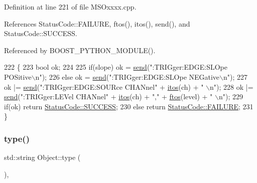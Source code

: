 Definition at line 221 of file M\+S\+Oxxxx.\+cpp.



References Status\+Code\+::\+F\+A\+I\+L\+U\+RE, ftos(), itos(), send(), and Status\+Code\+::\+S\+U\+C\+C\+E\+SS.



Referenced by B\+O\+O\+S\+T\+\_\+\+P\+Y\+T\+H\+O\+N\+\_\+\+M\+O\+D\+U\+L\+E().


\begin{DoxyCode}
222 \{
223     \textcolor{keywordtype}{bool} ok;
224 
225     \textcolor{keywordflow}{if}(slope) ok  = \hyperlink{classMSOxxxx_ae77668a1ae4ccb74e0ed5f2485dfdebf}{send}(\textcolor{stringliteral}{":TRIGger:EDGE:SLOpe POSitive\(\backslash\)n"});
226     \textcolor{keywordflow}{else}            ok  = \hyperlink{classMSOxxxx_ae77668a1ae4ccb74e0ed5f2485dfdebf}{send}(\textcolor{stringliteral}{":TRIGger:EDGE:SLOpe NEGative\(\backslash\)n"});
227                         ok |= \hyperlink{classMSOxxxx_ae77668a1ae4ccb74e0ed5f2485dfdebf}{send}(\textcolor{stringliteral}{":TRIGger:EDGE:SOURce CHANnel"} + \hyperlink{Tools_8h_af330027dbdafb9a30768b3613c553e60}{itos}(ch) + \textcolor{stringliteral}{" \(\backslash\)n"});
228                         ok |= \hyperlink{classMSOxxxx_ae77668a1ae4ccb74e0ed5f2485dfdebf}{send}(\textcolor{stringliteral}{":TRIGger:LEVel CHANnel"} + \hyperlink{Tools_8h_af330027dbdafb9a30768b3613c553e60}{itos}(ch) + \textcolor{stringliteral}{","} + 
      \hyperlink{classMSOxxxx_ab9c897c3dc0a52cbe5a5da67fc520ed7}{ftos}(level) + \textcolor{stringliteral}{" \(\backslash\)n"});
229     \textcolor{keywordflow}{if}(ok)  \textcolor{keywordflow}{return} \hyperlink{classStatusCode_a6f565cbeadc76d14c72f047e5e85eb4badd0da38d3ba0d922efd1f4619bc37ad8}{StatusCode::SUCCESS};
230     \textcolor{keywordflow}{else}        \textcolor{keywordflow}{return} \hyperlink{classStatusCode_a6f565cbeadc76d14c72f047e5e85eb4ba3da73d4c469762eb9d3c960368252b26}{StatusCode::FAILURE};  
231 \}
\end{DoxyCode}
\mbox{\label{classObject_a84f99f70f144a83e1582d1d0f84e4e62}} 
\subsubsection{\texorpdfstring{type()}{type()}}
{\footnotesize\ttfamily std\+::string Object\+::type (\begin{DoxyParamCaption}{ }\end{DoxyParamCaption})\hspace{0.3cm}{\ttfamily [inline]}, {\ttfamily [inherited]}}



